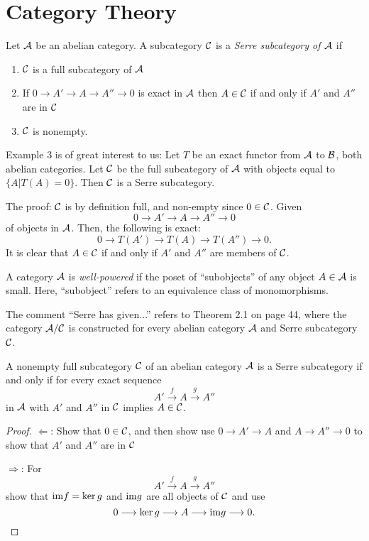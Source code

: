 \section{Category Theory}

\begin{definition} 
Let $\mathcal{A}$ be an abelian category. A subcategory
$\mathcal{C}$ is a \emph{Serre subcategory of $\mathcal{A}$}
if
\begin{enumerate}
\item $\mathcal{C}$ is a full subcategory of $\mathcal{A}$

\item If $0 \to A' \to A \to A''\to 0$ is exact in $\mathcal{A}$
then $A \in \mathcal{C}$ if and only if $A'$ and $A''$ are in
$\mathcal{C}$

\item $\mathcal{C}$ is nonempty.
\end{enumerate}
\end{definition}

Example 3 is of great interest to us: Let $T$ be an exact
functor from $\mathcal{A}$ to $\mathcal{B}$, both abelian categories.
Let $\mathcal{C}$ be the full subcategory of $\mathcal{A}$ with objects
equal to $\{A | T(A) = 0\}$. Then $\mathcal{C}$ is a Serre 
subcategory.

The proof: $\mathcal{C}$ is by definition full, and non-empty
since $0 \in \mathcal{C}$. Given
\[
0 \to A' \to A \to A'' \to 0
\]
of objects in $\mathcal{A}$. Then, the following is exact:
\[
0 \to T(A') \to T(A) \to T(A'') \to 0.
\]
It is clear that $A \in \mathcal{C}$ if and only if $A'$ and
$A''$ are members of $\mathcal{C}$.

\begin{definition}
A category $\mathcal{A}$ is \emph{well-powered} if the poset
of ``subobjects'' of any object $A \in \mathcal{A}$ is small.
Here, ``subobject'' refers to an equivalence class of
monomorphisms.
\end{definition}

The comment ``Serre has given...'' refers to Theorem 2.1 on
page 44, where the category $\mathcal{A}/\mathcal{C}$ is constructed
for every abelian category $\mathcal{A}$ and Serre subcategory
$\mathcal{C}$.

\begin{prop}
A nonempty full subcategory $\mathcal{C}$ of an abelian category
$\mathcal{A}$ is a Serre subcategory if and only if for every
exact sequence
\[
A' \stackrel{f}{\to} A \stackrel{g}{\to} A''
\]
in $\mathcal{A}$ with $A'$ and $A''$ in $\mathcal{C}$ implies
$A \in \mathcal{C}$.
\end{prop}
\begin{proof}
\noindent$\Leftarrow$: Show that $0 \in \mathcal{C}$, and then show
use $0 \to A' \to A$ and $A \to A'' \to 0$ to show that $A'$
and $A''$ are in $\mathcal{C}$

\noindent$\Rightarrow$: For
\[
A' \stackrel{f}{\to} A \stackrel{g}{\to} A''
\]
show that $\mathrm{im} f = \mathrm{ker}\, g$ and $\mathrm{im} g$ are all
objects of $\mathcal{C}$ and use
\[
0 \longrightarrow \mathrm{ker}\, g \longrightarrow A \longrightarrow \mathrm{im} g \longrightarrow 0.
\]
\end{proof}

